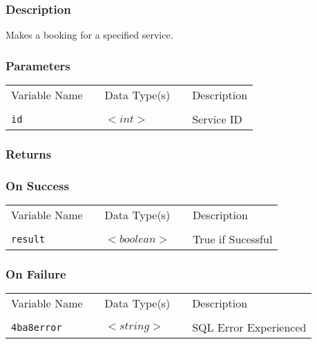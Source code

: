 \subsubsection{Description}

Makes a booking for a specified service.

\subsubsection{Parameters}

\begin{tabular}{lllll}
Variable Name	&		&	Data Type(s)		&	&	Description	\\
				&	&	&	&	\\
\verb!id! & \hspace{15mm} & $<int>$ & \hspace{15mm} & Service ID \\
\end{tabular}

\subsubsection{Returns}

\subsubsection{On Success}

\begin{tabular}{lllll}
Variable Name	&		&	Data Type(s)		&	&	Description	\\
				&	&	&	&	\\
\verb!result! & \hspace{15mm} & $<boolean>$ & \hspace{15mm} & True if Sucessful \\
\end{tabular}

\subsubsection{On Failure}

\begin{tabular}{lllll}
Variable Name	&		&	Data Type(s)		&	&	Description	\\
				&	&	&	&	\\
\verb!4ba8error! & \hspace{15mm} & $<string>$ & \hspace{15mm} & SQL Error Experienced \\
\end{tabular}


